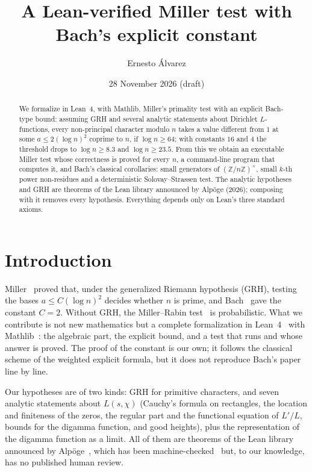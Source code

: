\documentclass[11pt,a4paper]{amsart}
\title[A verified Miller test with Bach's constant]{A Lean-verified Miller test with Bach's explicit constant}
\author{Ernesto \'Alvarez}
\date{28 November 2026 (draft)}
\theoremstyle{remark}
\newcommand{\Z}{\mathbb{Z}}
\begin{document}
\begin{abstract}
We formalize in Lean~4, with Mathlib, Miller's primality test with an explicit Bach-type bound: assuming GRH and several analytic statements about Dirichlet $L$-functions, every non-principal character modulo $n$ takes a value different from $1$ at some $a\le 2(\log n)^2$ coprime to $n$, if $\log n\ge 64$; with constants $16$ and $4$ the threshold drops to $\log n\ge 8.3$ and $\log n\ge 23.5$. From this we obtain an executable Miller test whose correctness is proved for every $n$, a command-line program that computes it, and Bach's classical corollaries: small generators of $(\Z/n\Z)^\times$, small $k$-th power non-residues and a deterministic Solovay--Strassen test. The analytic hypotheses and GRH are theorems of the Lean library announced by Alp\"oge (2026); composing with it removes every hypothesis. Everything depends only on Lean's three standard axioms.
\end{abstract}

\maketitle

\section{Introduction}

Miller~\cite{Miller} proved that, under the generalized Riemann hypothesis (GRH), testing the bases $a\le C(\log n)^2$ decides whether $n$ is prime, and Bach~\cite{Bach} gave the constant $C=2$. Without GRH, the Miller--Rabin test~\cite{Rabin} is probabilistic. What we contribute is not new mathematics but a complete formalization in Lean~4~\cite{Lean4} with Mathlib~\cite{Mathlib}: the algebraic part, the explicit bound, and a test that runs and whose answer is proved. The proof of the constant is our own; it follows the classical scheme of the weighted explicit formula, but it does not reproduce Bach's paper line by line.

Our hypotheses are of two kinds: GRH for primitive characters, and seven analytic statements about $L(s,\chi)$ (Cauchy's formula on rectangles, the location and finiteness of the zeros, the regular part and the functional equation of $L'/L$, bounds for the digamma function, and good heights), plus the representation of the digamma function as a limit. All of them are theorems of the Lean library announced by Alp\"oge~\cite{Alpoge}, which has been machine-checked~\cite{MIT} but, to our knowledge, has no published human review.
\end{document}
